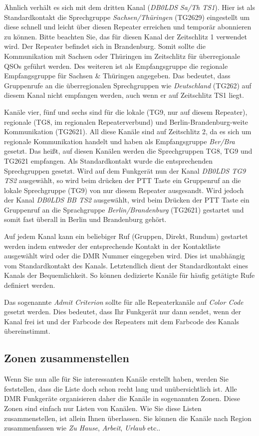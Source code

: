Ähnlich verhält es sich mit dem dritten Kanal (\emph{DB0LDS Sa/Th TS1}). Hier ist als Standardkontakt die Sprechgruppe \emph{Sachsen/Thüringen} (TG2629) eingestellt um diese schnell und leicht über diesen Repeater erreichen und temporär abonnieren zu können. Bitte beachten Sie, das für diesen Kanal der Zeitschlitz 1 verwendet wird. Der Repeater befindet sich in Brandenburg. Somit sollte die Kommunikation mit Sachsen oder Thüringen im Zeitschlitz für überregionale QSOs geführt werden. Des weiteren ist als Empfangsgruppe die regionale Empfangsgruppe für Sachsen \& Thüringen angegeben. Das bedeutet, dass Gruppenrufe an die überregionalen Sprechgruppen wie \emph{Deutschland} (TG262) auf diesem Kanal nicht empfangen werden, auch wenn er auf Zeitschlitz TS1 liegt.

Kanäle vier, fünf und sechs sind für die lokale (TG9, nur auf diesem Repeater), regionale (TG8, im regionalen Repeaterverbund) und Berlin-Brandenburg-weite Kommunikation (TG2621). All diese Kanäle sind auf Zeitschlitz 2, da es sich um regionale Kommunikation handelt und haben als Empfangsgruppe \emph{Ber/Bra} gesetzt. Das heißt, auf diesen Kanälen werden die Sprechgruppen TG8, TG9 und TG2621 empfangen. Als Standardkontakt wurde die entsprechenden Sprechgruppen gesetzt. Wird auf dem Funkgerät nun der Kanal \emph{DB0LDS TG9 TS2} ausgewählt, so wird beim drücken der PTT Taste ein Gruppenruf an die lokale Sprechgruppe (TG9) von nur diesem Repeater ausgesandt. Wird jedoch der Kanal \emph{DB0LDS BB TS2} ausgewählt, wird beim Drücken der PTT Taste ein Gruppenruf an die Sprachgruppe \emph{Berlin/Brandenburg} (TG2621) gestartet und somit fast überall in Berlin und Brandenburg gehört.

\begin{merke}
 Auf jedem Kanal kann ein beliebiger Ruf (Gruppen, Direkt, Rundum) gestartet werden indem entweder der entsprechende Kontakt in der Kontaktliste ausgewählt wird oder die DMR Nummer eingegeben wird. Dies ist unabhängig vom Standardkontakt des Kanals. Letztendlich dient der Standardkontakt eines Kanals der Bequemlichkeit. So können dedizierte Kanäle für häufig getätigte Rufe definiert werden.
\end{merke}

Das sogenannte \emph{Admit Criterion} sollte für alle Repeaterkanäle auf \emph{Color Code} gesetzt werden. Dies bedeutet, dass Ihr Funkgerät nur dann sendet, wenn der Kanal frei ist und der Farbcode des Repeaters mit dem Farbcode des Kanals übereinstimmt.

\subsection{Zonen zusammenstellen} \label{sec:zone} 
Wenn Sie nun alle für Sie interessanten Kanäle erstellt haben, werden Sie feststellen, dass die Liste doch schon recht lang und unübersichtlich ist. Alle DMR Funkgeräte organisieren daher die Kanäle in sogenannten Zonen. Diese Zonen sind einfach nur Listen von Kanälen. Wie Sie diese Listen zusammenstellen, ist allein Ihnen überlassen. Sie können die Kanäle nach Region zusammenfassen wie \emph{Zu Hause}, \emph{Arbeit}, \emph{Urlaub} etc.. 

